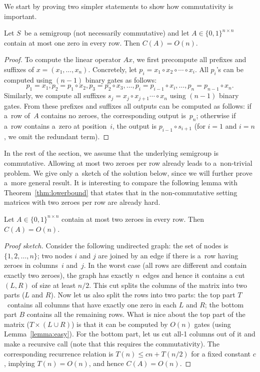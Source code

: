\documentclass[review,onefignum,onetabnum]{siamart190516}
\begin{document}
\matrixmultcor*

We start by proving two simpler statements to show how commutativity is important.

\begin{lemma}\label{lemma:easy}
Let $S$~be a semigroup (not necessarily commutative) and let
$A \in \{0,1\}^{n \times n}$ contain at most
one zero in every row. Then
$C(A) = O(n)$.
\end{lemma}

\begin{proof}
To compute the linear operator $Ax$, we first
precompute all prefixes and suffixes of $x=(x_1, \dotsc, x_n)$.
Concretely, let $p_i=x_1 \circ x_2 \circ \dotsb \circ x_i$. All $p_i$'s can be computed
using $(n-1)$ binary gates as follows:
\[
p_1=x_1, p_2=p_1 \circ x_2, p_3=p_2 \circ x_3, \dotsc, p_i=p_{i-1} \circ x_i, \dotsc, p_n=p_{n-1}\circ x_n.
\]
Similarly, we compute all suffixes
$s_j=x_j \circ x_{j+1} \dotsb \circ x_n$ using
$(n-1)$ binary gates. From these prefixes and suffixes
all outputs can be
computed as follows: if a~row of~$A$ contains no zeroes,
the corresponding
output is~$p_n$; otherwise if a~row contains a~zero at position~$i$, the
output is $p_{i-1} \circ s_{i+1}$ (for $i=1$ and $i=n$, we omit the redundant
term).
\end{proof}

In the rest of the section, we assume that the
underlying semigroup is
commutative. Allowing at most two zeroes per row already leads to a~non-trivial
problem. We give only a~sketch of the solution below, since we will further
prove a~more general result. It is interesting to compare the following lemma
with Theorem~\ref{thm:lowerbound} that states that in the
non-commutative setting matrices with two zeroes per row are already hard.

\begin{lemma} \label{lem:at_most_2}
Let $A \in \{0,1\}^{n \times n}$ contain at most two zeroes in every row. Then
$C(A) = O(n)$.
\end{lemma}
\begin{proof}[Proof sketch]
Consider the following undirected graph: the set of nodes is $\{1,2,\dotsc,n\}$;
two nodes $i$ and $j$ are joined by an edge if there is a~row having zeroes in
columns~$i$ and~$j$. In the worst case (all rows are different and contain
exactly two zeroes), the graph has exactly $n$~edges and hence it contains a cut
$(L,R)$ of size at least $n/2$. This cut splits the columns of the matrix into
two parts ($L$ and $R$). Now let us also split the rows into two parts: the top
part $T$~contains all columns that have exactly one zero in each $L$ and $R$;
the bottom part $B$ contains all the remaining rows. What is nice about the top
part of the matrix ($T \times (L \cup R)$) is that it can be computed by $O(n)$
gates (using Lemma~\ref{lemma:easy}). For the bottom part, let us cut all-1
columns out of it and make a recursive call (note that this requires the
commutativity). The corresponding recurrence relation is $T(n) \le cn + T(n/2)$
for a fixed constant $c$, implying $T(n)=O(n)$, and hence $C(A) = O(n)$.
\end{proof}
\end{document}
